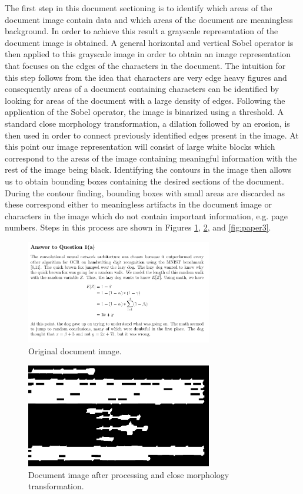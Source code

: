 \documentclass[12pt]{IEEEtran}
\begin{document}
The first step in this document sectioning is to identify which areas of the document image contain data and which areas of the document are meaningless background. In order to achieve this result a grayscale representation of the document image is obtained. A general horizontal and vertical Sobel operator is then applied to this grayscale image in order to obtain an image representation that focuses on the edges of the characters in the document. The intuition for this step follows from the idea that characters are very edge heavy figures and consequently areas of a document containing characters can be identified by looking for areas of the document with a large density of edges. Following the application of the Sobel operator, the image is binarized using a threshold. A standard close morphology transformation, a dilation followed by an erosion, is then used in order to connect previously identified edges present in the image. At this point our image representation will consist of large white blocks which correspond to the areas of the image containing meaningful information with the rest of the image being black. Identifying the contours in the image then allows us to obtain bounding boxes containing the desired sections of the document. During the contour finding, bounding boxes with small areas are discarded as these correspond either to meaningless artifacts in the document image or characters in the image which do not contain important information, e.g. page numbers. Steps in this process are shown in Figures \ref{fig:paper1}, \ref{fig:paper2}, and \ref{fig:paper3}.

\begin{figure}[h]
  \centering
    \includegraphics[width=3.2in]{paper1.png}
  \caption{Original document image.}
  \label{fig:paper1}
\end{figure}

\begin{figure}[h]
  \centering
    \includegraphics[width=3.2in]{paper1-morph.png}
  \caption{Document image after processing and close morphology transformation.}
  \label{fig:paper2}
\end{figure}
\end{document}
